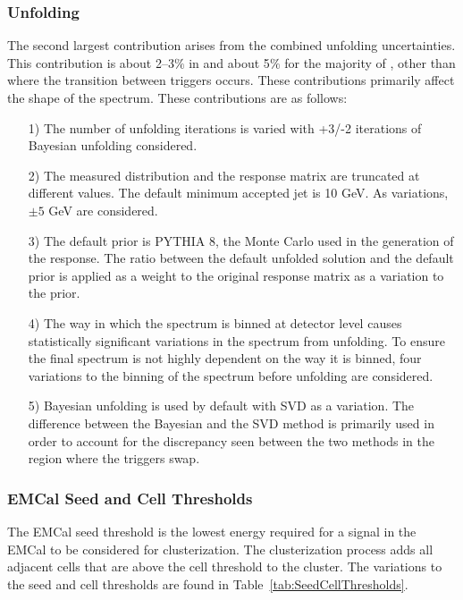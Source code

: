 \subsubsection{Unfolding}

The second largest contribution arises from the combined unfolding uncertainties. This contribution is about 2--3$\%$ in \pp and about 5$\%$ for the majority of \pPb, other than where the transition between triggers occurs. These contributions primarily affect the shape of the spectrum. These contributions are as follows: 

\begin{itemize}
    \item[1)] The number of unfolding iterations is varied with +3/-2 iterations of Bayesian unfolding considered.
    \item[2)] The measured distribution and the response matrix are truncated at different values. The default minimum accepted jet \pT is 10 GeV. As variations, $\pm 5$ GeV are considered.
    \item[3)] The default prior is PYTHIA 8, the Monte Carlo used in the generation of the response. The ratio between the default unfolded solution and the default prior is applied as a weight to the original response matrix as a variation to the prior.
    \item[4)] The way in which the spectrum is binned at detector level causes statistically significant variations in the spectrum from unfolding. To ensure the final spectrum is not highly dependent on the way it is binned, four variations to the binning of the spectrum before unfolding are considered.
    \item[5)] Bayesian unfolding is used by default with SVD as a variation. The difference between the Bayesian and the SVD method is primarily used in order to account for the discrepancy seen between the two methods in the region where the triggers swap.
\end{itemize}

\subsubsection{EMCal Seed and Cell Thresholds}

The EMCal seed threshold is the lowest energy required for a signal in the EMCal to be considered for clusterization. The clusterization process adds all adjacent cells that are above the cell threshold to the cluster. The variations to the seed and cell thresholds are found in Table~\ref{tab:SeedCellThresholds}.


